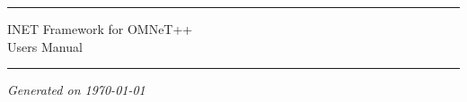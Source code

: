 

\begin{center}\end{center}
\vspace{16em}
\hrule
\vspace{2em}
\begin{center}
{\LARGE INET Framework for OMNeT++}\\
\vspace{1em}
{\large Users Manual}\\
\end{center}
\vspace{2em}
\hrule


\vspace{8em}

\begin{center}
\textit{Generated on \today}
\end{center}



